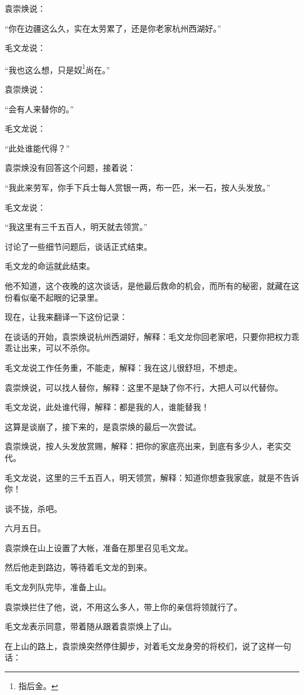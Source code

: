 \begin{multicols}{\theparacolNo}
		袁崇焕说：

		“你在边疆这么久，实在太劳累了，还是你老家杭州西湖好。”

		毛文龙说：

		“我也这么想，只是奴\footnote{指后金。}尚在。”

		袁崇焕说：

		“会有人来替你的。”

		毛文龙说：

		“此处谁能代得？”

		袁崇焕没有回答这个问题，接着说：

		“我此来劳军，你手下兵士每人赏银一两，布一匹，米一石，按人头发放。”

		毛文龙说：

		“我这里有三千五百人，明天就去领赏。”

		讨论了一些细节问题后，谈话正式结束。

		毛文龙的命运就此结束。

		他不知道，这个夜晚的这次谈话，是他最后救命的机会，而所有的秘密，就藏在这份看似毫不起眼的记录里。

		现在，让我来翻译一下这份记录：

		在谈话的开始，袁崇焕说杭州西湖好，解释：毛文龙你回老家吧，只要你把权力乖乖让出来，可以不杀你。

		毛文龙说工作任务重，不能走，解释：我在这儿很舒坦，不想走。

		袁崇焕说，可以找人替你，解释：这里不是缺了你不行，大把人可以代替你。

		毛文龙说，此处谁代得，解释：都是我的人，谁能替我！

		这算是谈崩了，接下来的，是袁崇焕的最后一次尝试。

		袁崇焕说，按人头发放赏赐，解释：把你的家底亮出来，到底有多少人，老实交代。

		毛文龙说，这里的三千五百人，明天领赏，解释：知道你想查我家底，就是不告诉你！

		谈不拢，杀吧。

		六月五日。

		袁崇焕在山上设置了大帐，准备在那里召见毛文龙。

		然后他走到路边，等待着毛文龙的到来。

		毛文龙列队完毕，准备上山。

		袁崇焕拦住了他，说，不用这么多人，带上你的亲信将领就行了。

		毛文龙表示同意，带着随从跟着袁崇焕上了山。

		在上山的路上，袁崇焕突然停住脚步，对着毛文龙身旁的将校们，说了这样一句话：


\end{multicols}
